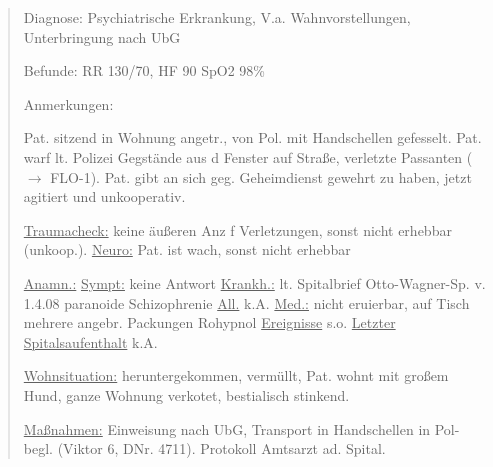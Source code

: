 \begin{quote}
{\sffamily Diagnose:} {\ttfamily\color{darkBlue}
Psychiatrische Erkrankung, V.a. Wahnvorstellungen, Unterbringung nach UbG}

{\sffamily Befunde:} {\sffamily RR}
{\ttfamily\color{darkBlue} 130/70,} {\sffamily HF}
{\ttfamily\color{darkBlue} 90} {\sffamily SpO2}
{\ttfamily\color{darkBlue} 98\% }

{\sffamily Anmerkungen:} {\ttfamily\color{darkBlue} Pat.
sitzend in Wohnung angetr., von Pol. mit Handschellen gefesselt. Pat. warf lt. Polizei Gegstände aus d Fenster
auf Straße, verletzte Passanten ($\rightarrow$ FLO-1). Pat.
gibt an sich geg. Geheimdienst gewehrt zu haben,
jetzt agitiert und unkooperativ. 

\underline{Traumacheck:} keine äußeren Anz f Verletzungen,
sonst nicht erhebbar (unkoop.). \underline{Neuro:} Pat.
ist wach, sonst nicht erhebbar

\underline{Anamn.:} \underline{Sympt:} keine Antwort
\underline{Krankh.:} lt. Spitalbrief Otto-Wagner-Sp. v.
1.4.08 paranoide Schizophrenie \underline{All.} k.A.
\underline{Med.:} nicht eruierbar, auf Tisch mehrere
angebr. Packungen Rohypnol \underline{Ereignisse} s.o.
\underline{Letzter Spitalsaufenthalt} k.A.

\underline{Wohnsituation:} heruntergekommen, vermüllt, Pat.
wohnt mit großem Hund, ganze Wohnung verkotet, bestialisch
stinkend. 

\underline{Maßnahmen:} Einweisung nach UbG, Transport in
Handschellen in Pol-begl. (Viktor 6, DNr. 4711). Protokoll
Amtsarzt ad. Spital.}
\end{quote}



% 
% 

\nocite{UlfigHistologie1}